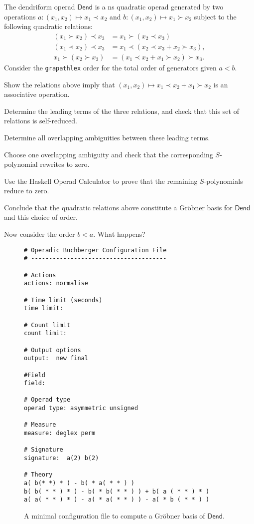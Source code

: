 \begin{question}\label{ex:Dend} The dendriform operad 
$\mathsf{Dend}$ is a ns quadratic operad
generated by two operations $a: (x_1,x_2)\mapsto x_1\prec x_2$ and $
b: (x_1,x_2) \mapsto x_1\succ x_2$ subject to the following
quadratic relations:
\begin{align*}
(x_1\succ x_2)\prec x_3 &= x_1 \succ (x_2\prec x_3) \\
(x_1  \prec x_2) \prec x_3 &=x_1 \prec (x_2 \prec x_3 +x_2 \succ x_3),\\
x_1 \succ (x_2 \succ x_3) &= (x_1 \prec x_2 +x_1 \succ x_2) \succ x_3  .
\end{align*}
Consider the \texttt{grapathlex} order for the total order of
generators given $a < b$.
\begin{tenumerate}
\item Show the relations above imply that $(x_1,x_2)\longmapsto x_1\prec x_2+x_1\succ x_2$ is an associative operation.
\item Determine the leading terms of the three relations, and
check that this set of relations is self-reduced.
\item Determine all overlapping ambiguities between these
leading terms.
\item Choose one overlapping ambiguity and check that the
corresponding $S$-polynomial rewrites to zero.
\item Use the Haskell Operad Calculator to prove that the
remaining $S$-polynomials reduce to zero.
\item Conclude that
the quadratic relations above constitute a Gr\"obner basis for
$\mathsf{Dend}$ and this choice of order.
\item Now consider the order $b < a$. What happens?
\end{tenumerate}
\end{question}
\begin{figure}
\begin{verbatim}
# Operadic Buchberger Configuration File
# --------------------------------------

# Actions
actions: normalise 

# Time limit (seconds)
time limit: 

# Count limit
count limit: 

# Output options	
output:  new final  

#Field
field: 

# Operad type
operad type: asymmetric unsigned

# Measure 
measure: deglex perm

# Signature
signature:  a(2) b(2)

# Theory 
a( b(* *) * ) - b( * a( * * ) )
b( b( * * ) * ) - b( * b( * * ) ) + b( a ( * * ) * )
a( a( * * ) * ) - a( * a( * * ) ) - a( * b ( * * ) )
\end{verbatim}
\caption{A minimal configuration file to compute a Gr\"obner basis of
$\mathsf{Dend}$.}
\end{figure}

